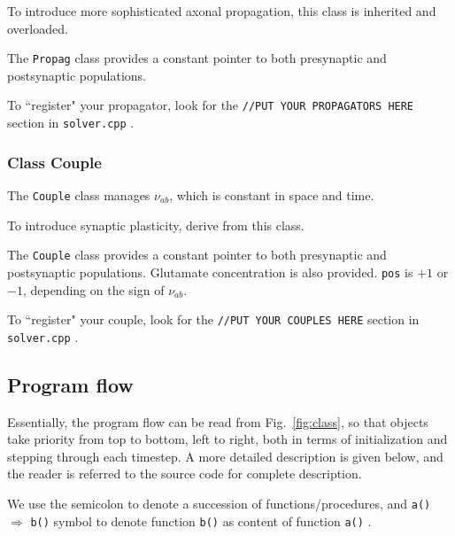 \documentclass[12pt,a4paper]{article}
\newcommand{\type}[1]{ {\small\small\tt #1} }
\begin{document}
To introduce more sophisticated axonal propagation, this class is inherited and overloaded.

The \type{Propag} class provides a constant pointer to both presynaptic and postsynaptic populations.

To ``register" your propagator, look for the \type{//PUT YOUR PROPAGATORS HERE} section in \type{solver.cpp}.

\subsubsection{Class Couple}
\label{sec:couple}

The \type{Couple} class manages \(\nu_{ab}\), which is constant in space and time.

To introduce synaptic plasticity, derive from this class.

The \type{Couple} class provides a constant pointer to both presynaptic and postsynaptic populations. Glutamate concentration is also provided. \type{pos} is $+1$ or $-1$, depending on the sign of \(\nu_{ab}\).

To ``register" your couple, look for the \type{//PUT YOUR COUPLES HERE} section in \type{solver.cpp}.

\subsection{Program flow}

Essentially, the program flow can be read from Fig.~\ref{fig:class}, so that objects take priority from top to bottom, left to right, both in terms of initialization and stepping through each timestep. A more detailed description is given below, and the reader is referred to the source code for complete description.

We use the semicolon to denote a succession of functions/procedures, and \type{a()} $\Rightarrow$ \type{b()} symbol to denote function \type{b()} as content of function \type{a()}.
\end{document}
